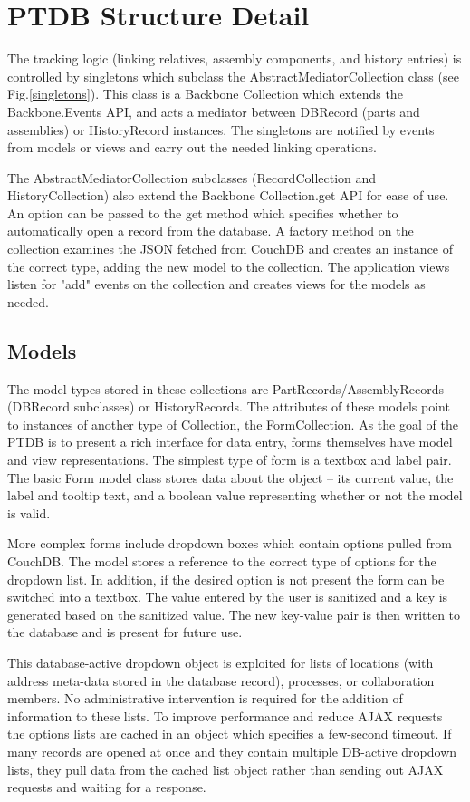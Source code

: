 \documentclass[journal]{IEEEtran}
\begin{document}
\section{PTDB Structure Detail}
The tracking logic (linking relatives, assembly components, and history entries) is controlled
by singletons which subclass the AbstractMediatorCollection class (see Fig.\ref{singletons}). This class is a Backbone Collection
which extends the Backbone.Events API, and acts a mediator between DBRecord (parts and assemblies) or
HistoryRecord instances. The singletons are notified by events from models or views and carry out the needed
linking operations.

The AbstractMediatorCollection subclasses (RecordCollection and HistoryCollection) also extend the
Backbone Collection.get API for ease of use. An option can be passed to the get method which
specifies whether to automatically open a record from the database.
A factory method on the collection examines the JSON
fetched from CouchDB and creates an instance of the correct type, adding the new model
to the collection. The application views listen for "add" events on the collection and creates views
for the models as needed.

\subsection{Models}

The model types stored in these collections are PartRecords/AssemblyRecords (DBRecord subclasses) or HistoryRecords.
The attributes of these models point to instances of another type of Collection,
the FormCollection. As the goal of the PTDB is to present a rich interface for data entry, forms
themselves have model and view representations. The simplest type of form is a textbox and label 
pair. The basic Form model class stores data about the object -- its current value, the label and tooltip text,
and a boolean value representing whether or not the model is valid.

More complex forms include dropdown boxes which contain options pulled from CouchDB. The model
stores a reference to the correct type of options for the dropdown list. In addition, if the 
desired option is not present the form can be switched into a textbox. The value entered by
the user is sanitized and a key is generated based on the sanitized value. The new key-value
pair is then written to the database and is present for future use.

This database-active dropdown object is exploited for lists of locations (with address meta-data
stored in the database record), processes, or collaboration members. No administrative intervention
is required for the addition of information to these lists. To improve performance and reduce
AJAX requests the options lists are cached in an object which specifies a few-second timeout.
If many records are opened at once and they contain multiple DB-active dropdown lists, they 
pull data from the cached list object rather than sending out AJAX requests and waiting for 
a response.
\end{document}
